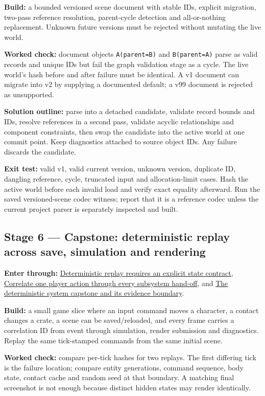 \textbf{Build:} a bounded versioned scene document with stable IDs, explicit migration, two-pass reference resolution, parent-cycle detection and all-or-nothing replacement. Unknown future versions must be rejected without mutating the live world.

\textbf{Worked check:} document objects \texttt{A(parent=B)} and \texttt{B(parent=A)} parse as valid records and unique IDs but fail the graph validation stage as a cycle. The live world's hash before and after failure must be identical. A v1 document can migrate into v2 by supplying a documented default; a v99 document is rejected as unsupported.

\textbf{Solution outline:} parse into a detached candidate, validate record bounds and IDs, resolve references in a second pass, validate acyclic relationships and component constraints, then swap the candidate into the active world at one commit point. Keep diagnostics attached to source object IDs. Any failure discards the candidate.

\textbf{Exit test:} valid v1, valid current version, unknown version, duplicate ID, dangling reference, cycle, truncated input and allocation-limit cases. Hash the active world before each invalid load and verify exact equality afterward. Run the saved versioned-scene codec witness; report that it is a reference codec unless the current project parser is separately inspected and built.

\subsection{Stage 6 --- Capstone: deterministic replay across save, simulation and rendering}\label{stage-6-capstone-deterministic-replay-across-save-simulation-and-rendering}

\textbf{Enter through:} \hyperref[06-engine-ii-ch042]{Deterministic replay requires an explicit state contract}, \hyperref[06-engine-ii-ch041]{Correlate one player action through every subsystem hand-off}, and \hyperref[06-engine-ii-ch042]{The deterministic system capstone and its evidence boundary}.

\textbf{Build:} a small game slice where an input command moves a character, a contact changes a crate, a scene can be saved/reloaded, and every frame carries a correlation ID from event through simulation, render submission and diagnostics. Replay the same tick-stamped commands from the same initial scene.

\textbf{Worked check:} compare per-tick hashes for two replays. The first differing tick is the failure location; compare entity generations, command sequence, body state, contact cache and random seed at that boundary. A matching final screenshot is not enough because distinct hidden states may render identically.

